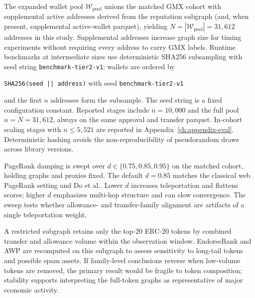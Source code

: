 
The expanded wallet pool $\mathcal{W}_{\mathrm{pool}}$ unions the matched GMX cohort with supplemental active addresses derived from the reputation subgraph (and, when present, supplemental active-wallet parquet), yielding $N=|\mathcal{W}_{\mathrm{pool}}|=31{,}612$ addresses in this study. Supplemental addresses increase graph size for timing experiments without requiring every address to carry GMX labels. Runtime benchmarks at intermediate sizes use deterministic SHA256 subsampling with seed string \texttt{benchmark-tier2-v1}: wallets are ordered by
\begin{center}
\texttt{SHA256(seed || address)} with seed \texttt{benchmark-tier2-v1}
\end{center}
and the first $n$ addresses form the subsample. The seed string is a fixed configuration constant. Reported stages include $n=10{,}000$ and the full pool $n=N=31{,}612$, always on the same approval and transfer parquet. In-cohort scaling stages with $n\le 5{,}521$ are reported in Appendix~\ref{ch:appendix-eval}. Deterministic hashing avoids the non-reproducibility of pseudorandom draws across library versions.


PageRank damping is swept over $d\in\{0.75,0.85,0.95\}$ on the matched cohort, holding graphs and proxies fixed. The default $d=0.85$ matches the classical web PageRank setting  and Do et al.. Lower $d$ increases teleportation and flattens scores; higher $d$ emphasizes multi-hop structure and can slow convergence. The sweep tests whether allowance- and transfer-family alignment are artifacts of a single teleportation weight.


A restricted subgraph retains only the top-$20$ ERC-20 tokens by combined transfer and allowance volume within the observation window. EndorseRank and AWP are recomputed on this subgraph to assess sensitivity to long-tail tokens and possible spam assets. If family-level conclusions reverse when low-volume tokens are removed, the primary result would be fragile to token composition; stability supports interpreting the full-token graphs as representative of major economic activity.


